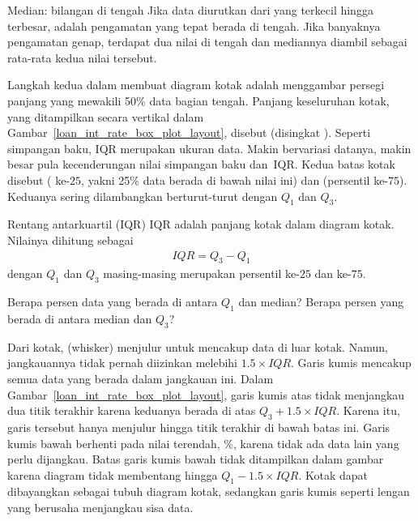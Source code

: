 \begin{onebox}{Median: bilangan di tengah}
  Jika data diurutkan dari yang terkecil hingga terbesar,
   adalah pengamatan yang tepat berada di tengah.
  Jika banyaknya pengamatan genap, terdapat dua nilai di tengah
  dan mediannya diambil sebagai rata-rata kedua nilai tersebut.
\end{onebox}

Langkah kedua dalam membuat diagram kotak adalah menggambar persegi
panjang yang mewakili 50\% data bagian tengah.
Panjang keseluruhan kotak, yang ditampilkan secara vertikal dalam
Gambar~\ref{loan_int_rate_box_plot_layout}, disebut
 (disingkat ).
Seperti simpangan baku, IQR merupakan ukuran
 data.
Makin bervariasi datanya, makin besar pula kecenderungan nilai
simpangan baku dan~IQR.
Kedua batas kotak disebut 
 ( ke-$25$,
yakni 25\% data berada di bawah nilai ini) dan
(persentil ke-$75$). Keduanya sering dilambangkan berturut-turut
dengan $Q_1$ dan
$Q_3$.

\begin{onebox}{Rentang antarkuartil (IQR)}
  IQR adalah panjang kotak dalam
  diagram kotak. Nilainya dihitung sebagai
  \begin{eqnarray*}
  IQR = Q_3 - Q_1
  \end{eqnarray*}
  dengan $Q_1$ dan $Q_3$ masing-masing merupakan persentil
  ke-$25$ dan ke-$75$.
\end{onebox}

\begin{exercisewrap}
\begin{nexercise}
Berapa persen data yang berada di antara $Q_1$ dan median?
Berapa persen yang berada di antara median dan $Q_3$?\footnotemark{}
\end{nexercise}
\end{exercisewrap}

Dari kotak,  (whisker) menjulur untuk
mencakup data di luar kotak. Namun, jangkauannya tidak pernah
diizinkan melebihi $1.5\times IQR$.
Garis kumis mencakup semua data yang berada dalam jangkauan ini.
Dalam Gambar~\ref{loan_int_rate_box_plot_layout}, garis kumis atas
tidak menjangkau dua titik terakhir karena keduanya berada di atas
$Q_3 + 1.5\times IQR$. Karena itu, garis tersebut hanya menjulur
hingga titik terakhir di bawah batas ini.
Garis kumis bawah berhenti pada nilai terendah,
\loanSmallestValue{}\%, karena tidak ada data lain yang perlu
dijangkau. Batas garis kumis bawah tidak ditampilkan dalam gambar
karena diagram tidak membentang hingga $Q_1 - 1.5\times IQR$.
Kotak dapat dibayangkan sebagai tubuh diagram kotak, sedangkan
garis kumis seperti lengan yang berusaha menjangkau sisa data.

